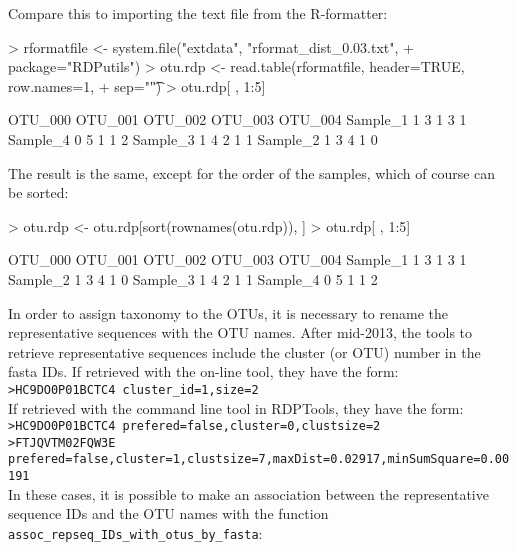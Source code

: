 \documentclass{article}
\begin{document}
Compare this to importing the text file from the R-formatter:
\begin{Schunk}
\begin{Sinput}
> rformatfile <- system.file("extdata", "rformat_dist_0.03.txt", 
+                            package="RDPutils")
> otu.rdp <- read.table(rformatfile, header=TRUE, row.names=1, 
+                       sep="\t")
> otu.rdp[ , 1:5]
\end{Sinput}
\begin{Soutput}
         OTU_000 OTU_001 OTU_002 OTU_003 OTU_004
Sample_1       1       3       1       3       1
Sample_4       0       5       1       1       2
Sample_3       1       4       2       1       1
Sample_2       1       3       4       1       0
\end{Soutput}
\end{Schunk}
The result is the same, except for the order of the samples, which of course can be sorted:
\begin{Schunk}
\begin{Sinput}
> otu.rdp <- otu.rdp[sort(rownames(otu.rdp)), ]
> otu.rdp[ , 1:5]
\end{Sinput}
\begin{Soutput}
         OTU_000 OTU_001 OTU_002 OTU_003 OTU_004
Sample_1       1       3       1       3       1
Sample_2       1       3       4       1       0
Sample_3       1       4       2       1       1
Sample_4       0       5       1       1       2
\end{Soutput}
\end{Schunk}
In order to assign taxonomy to the OTUs, it is necessary to rename the representative sequences with the OTU names.  After mid-2013, the tools to retrieve representative sequences include the cluster (or OTU) number in the fasta IDs.
If retrieved with the on-line tool, they have the form:\\
\texttt{>HC9DO0P01BCTC4 cluster\_id=1,size=2}\\
If retrieved with the command line tool in RDPTools, they have the form:\\
\texttt{>HC9DO0P01BCTC4 prefered=false,cluster=0,clustsize=2}\\
\texttt{>FTJQVTM02FQW3E  prefered=false,cluster=1,clustsize=7,maxDist=0.02917,minSumSquare=0.00191}\\
In these cases, it is possible to make an association between the representative sequence IDs and the OTU names with the function \texttt{assoc\_repseq\_IDs\_with\_otus\_by\_fasta}:
\end{document}
